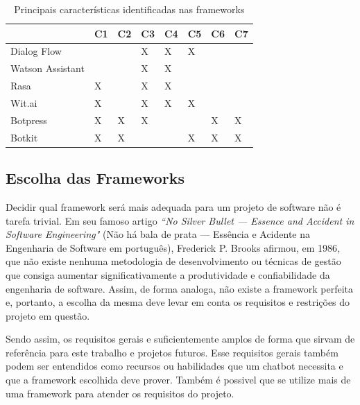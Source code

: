 \begin{table}[H]
    
    \begin{center}
    \begin{tabular}{| p{2cm}| p{1cm}| p{1cm} | p{1cm}| p{1cm}| p{1cm}| p{1cm}| p{1cm}|}
     \hline
       & C1 & C2 & C3 & C4 & C5 & C6 & C7\\
    \hline
     Dialog Flow &  &   & X & X & X  &  &  \\
     \hline
     Watson Assistant &  &   & X & X &   &  &  \\
    
    \hline
     Rasa & X &   & X & X &   &  &  \\
    
    \hline
     Wit.ai & X &   & X & X & X &  &  \\
    
    \hline
     Botpress & X & X & X &  &   & X & X\\
    
    \hline
     Botkit & X & X &   &   & X & X & X\\
    
   \hline
   
    \end{tabular}
    \caption{ Principais características identificadas nas frameworks}
    \label{tabela:comparativo}
    \end{center}
   
\end{table}


\subsection{Escolha das Frameworks}


Decidir qual framework será mais adequada para um projeto de software não é tarefa trivial. Em seu famoso artigo \textit{“No Silver Bullet — Essence and Accident in Software Engineering"} (Não há bala de prata — Essência e Acidente na Engenharia de Software em português), Frederick P. Brooks afirmou, em 1986, que não existe nenhuma metodologia de desenvolvimento ou técnicas de gestão que consiga aumentar significativamente a produtividade e confiabilidade da engenharia de software. Assim, de forma analoga, não existe a framework perfeita e, portanto, a escolha da mesma deve levar em conta os requisitos e restrições do projeto em questão.

Sendo assim, os requisitos gerais e suficientemente amplos de forma que sirvam de referência para este trabalho e projetos futuros. Esse requisitos gerais também podem ser entendidos como recursos ou habilidades que um chatbot necessita e que a framework escolhida deve prover. Também é possivel que se utilize mais de uma framework para atender os requisitos do projeto.


